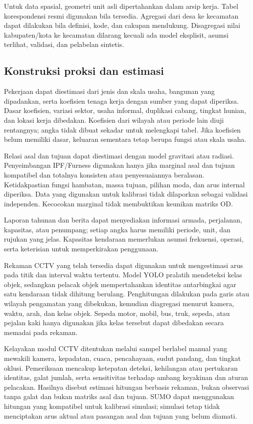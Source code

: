 \documentclass[11pt,a4paper,oneside,openany,indonesian]{report}
\begin{document}
Untuk data spasial, geometri unit asli dipertahankan dalam arsip kerja.
Tabel korespondensi resmi digunakan bila tersedia. Agregasi dari desa ke
kecamatan dapat dilakukan bila definisi, kode, dan cakupan mendukung.
Disagregasi nilai kabupaten/kota ke kecamatan dilarang kecuali ada model
eksplisit, asumsi terlihat, validasi, dan pelabelan sintetis.

\subsection{Konstruksi proksi dan
estimasi}\label{konstruksi-proksi-dan-estimasi}

Pekerjaan dapat diestimasi dari jenis dan skala usaha, bangunan yang
dipadankan, serta koefisien tenaga kerja dengan sumber yang dapat
diperiksa. Dasar koefisien, variasi sektor, usaha informal, duplikasi
cabang, tingkat hunian, dan lokasi kerja dibedakan. Koefisien dari
wilayah atau periode lain diuji rentangnya; angka tidak dibuat sekadar
untuk melengkapi tabel. Jika koefisien belum memiliki dasar, keluaran
sementara tetap berupa fungsi atau skala usaha.

Relasi asal dan tujuan dapat diestimasi dengan model gravitasi atau
radiasi. Penyeimbangan IPF/Furness digunakan hanya jika marginal asal
dan tujuan kompatibel dan totalnya konsisten atau penyesuaiannya
beralasan. Ketidakpastian fungsi hambatan, massa tujuan, pilihan moda,
dan arus internal diperiksa. Data yang digunakan untuk kalibrasi tidak
dilaporkan sebagai validasi independen. Kecocokan marginal tidak
membuktikan keunikan matriks OD.

Laporan tahunan dan berita dapat menyediakan informasi armada,
perjalanan, kapasitas, atau penumpang; setiap angka harus memiliki
periode, unit, dan rujukan yang jelas. Kapasitas kendaraan memerlukan
asumsi frekuensi, operasi, serta keterisian untuk memperkirakan
penggunaan.

Rekaman CCTV yang telah tersedia dapat digunakan untuk mengestimasi arus
pada titik dan interval waktu tertentu. Model YOLO pralatih mendeteksi
kelas objek, sedangkan pelacak objek mempertahankan identitas antarbingkai
agar satu kendaraan tidak dihitung berulang. Penghitungan dilakukan pada
garis atau wilayah pengamatan yang dibekukan, kemudian diagregasi menurut
kamera, waktu, arah, dan kelas objek. Sepeda motor, mobil, bus, truk,
sepeda, atau pejalan kaki hanya digunakan jika kelas tersebut dapat
dibedakan secara memadai pada rekaman.

Kelayakan modul CCTV ditentukan melalui sampel berlabel manual yang
mewakili kamera, kepadatan, cuaca, pencahayaan, sudut pandang, dan tingkat
oklusi. Pemeriksaan mencakup ketepatan deteksi, kehilangan atau pertukaran
identitas, galat jumlah, serta sensitivitas terhadap ambang keyakinan dan
aturan pelacakan. Hasilnya disebut estimasi hitungan berbasis rekaman,
bukan observasi tanpa galat dan bukan matriks asal dan tujuan. SUMO dapat
menggunakan hitungan yang kompatibel untuk kalibrasi simulasi; simulasi
tetap tidak menciptakan arus aktual atau pasangan asal dan tujuan yang
belum diamati.
\end{document}
